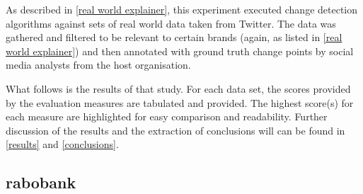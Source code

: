 \documentclass{uvamscse}	%
\begin{document}
As described in \autoref{real world explainer}, this experiment executed change detection algorithms against sets of real world data taken from Twitter. The data was gathered and filtered to be relevant to certain brands (again, as listed in \autoref{real world explainer}) and then annotated with ground truth change points by social media analysts from the host organisation.

What follows is the results of that study. For each data set, the scores provided by the evaluation measures are tabulated and provided. The highest score(s) for each measure are highlighted for easy comparison and readability. Further discussion of the results and the extraction of conclusions will can be found in \autoref{results} and \autoref{conclusions}.

\subsection{rabobank}
\end{document}
